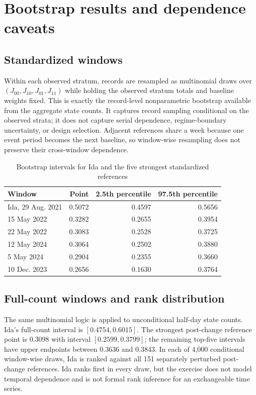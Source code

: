 \documentclass[11pt]{article}
\begin{document}
\section{Bootstrap results and dependence caveats}

\subsection{Standardized windows}

Within each observed stratum, records are resampled as multinomial draws over $(J_{00},J_{10},J_{01},J_{11})$ while holding the observed stratum totals and baseline weights fixed. This is exactly the record-level nonparametric bootstrap available from the aggregate state counts. It captures record sampling conditional on the observed strata; it does not capture serial dependence, regime-boundary uncertainty, or design selection. Adjacent references share a week because one event period becomes the next baseline, so window-wise resampling does not preserve their cross-window dependence.

\begin{table}[t]
\centering
\caption{Bootstrap intervals for Ida and the five strongest standardized references}
\label{tab:bootstd}
\begin{tabular}{@{}lrrr@{}}
\toprule
Window & Point & 2.5th percentile & 97.5th percentile \\
\midrule
Ida, 29 Aug. 2021 & 0.5072 & 0.4597 & 0.5656 \\
15 May 2022 & 0.3282 & 0.2655 & 0.3954 \\
22 May 2022 & 0.3083 & 0.2528 & 0.3725 \\
12 May 2024 & 0.3064 & 0.2502 & 0.3880 \\
5 May 2024 & 0.2904 & 0.2355 & 0.3660 \\
10 Dec. 2023 & 0.2656 & 0.1630 & 0.3764 \\
\bottomrule
\end{tabular}
\end{table}

\subsection{Full-count windows and rank distribution}

The same multinomial logic is applied to unconditional half-day state counts. Ida's full-count interval is $[0.4754,0.6015]$. The strongest post-change reference point is 0.3098 with interval $[0.2599,0.3799]$; the remaining top-five intervals have upper endpoints between 0.3636 and 0.3843. In each of 4,000 conditional window-wise draws, Ida is ranked against all 151 separately perturbed post-change references. Ida ranks first in every draw, but the exercise does not model temporal dependence and is not formal rank inference for an exchangeable time series.
\end{document}
